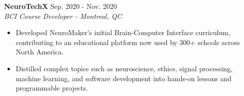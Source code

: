 \documentclass[10pt,letterpaper]{article}
\newcommand{\resumeHeading}[3]{
    \textbf{#1} \hfill #3\\
    \textit{#2}
}
\newcommand{\resumeFooting}[0]{
    \vspace{0.5em}
}
\newcommand{\projectHeading}[1]{
    \textbf{#1}
}
\begin{document}
\resumeHeading
{NeuroTechX}
{BCI Course Developer - Montreal, QC}
{Sep. 2020 - Nov. 2020}

\begin{itemize}
\item Developed NeuroMaker's initial Brain-Computer Interface curriculum, contributing to an educational platform now used by 300+ schools across North America.
\item Distilled complex topics such as neuroscience, ethics, signal processing, machine learning, and software development into hands-on lessons and programmable projects.

\end{itemize}
\resumeFooting{}





\end{document}
